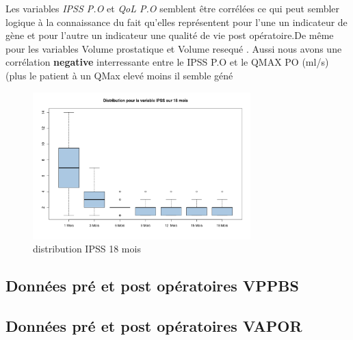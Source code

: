 Les variables  \emph{IPSS P.O} et   \emph{QoL P.O}  semblent être corrélées ce qui peut sembler logique à la connaissance du fait 
qu’elles représentent pour l’une un indicateur de gène et pour l’autre un indicateur une qualité de vie post opératoire.De même  pour les variables Volume prostatique et Volume resequé . Aussi nous avons une corrélation \textbf{negative} interressante entre le IPSS P.O et le QMAX PO (ml/s) (plus le patient à un QMax elevé moins il semble géné

\begin{figure}[!h]
\centering
\includegraphics[width=0.75\textwidth]{../Fig/rtupb-boxplot-ipss}
\caption{distribution IPSS 18 mois}
\end{figure}






\newpage

\subsection{Données pré et post opératoires VPPBS }
\newpage


\subsection{Données pré et post opératoires VAPOR}
\newpage